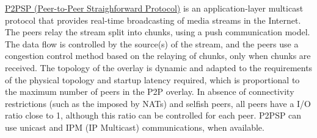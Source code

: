 

\href{https://p2psp.github.io}{P2PSP (Peer-to-Peer Straighforward
  Protocol)} is an application-layer multicast protocol that provides
real-time broadcasting of media streams in the Internet. The peers
relay the stream split into chunks, using a push communication
model. The data flow is controlled by the source(s) of the stream, and
the peers use a congestion control method based on the relaying of
chunks, only when chunks are received. The topology of the overlay is
dynamic and adapted to the requirements of the physical topology and
startup latency required, which is proportional to the maximum number
of peers in the P2P overlay. In absence of connectivity restrictions
(such as the imposed by NATs) and selfish peers, all peers have a I/O
ratio close to 1, although this ratio can be controlled for each
peer. P2PSP can use unicast and IPM (IP Multicast) communications,
when available.
